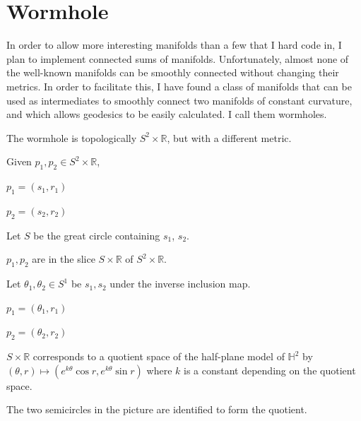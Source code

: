 \section{Wormhole}

In order to allow more interesting manifolds than a few that I hard code in, I plan to implement connected sums of manifolds. Unfortunately, almost none of the well-known manifolds can be smoothly connected without changing their metrics. In order to facilitate this, I have found a class of manifolds that can be used as intermediates to smoothly connect two manifolds of constant curvature, and which allows geodesics to be easily calculated. I call them wormholes.

The wormhole is topologically $S^2 \times \mathbb{R}$, but with a different metric.

Given $p_1, p_2 \in S^2 \times \mathbb{R}$,

$p_1 = (s_1,r_1)$

$p_2 = (s_2,r_2)$

Let $S$ be the great circle containing $s_1$, $s_2$.

$p_1, p_2$ are in the slice $S \times \mathbb{R}$ of $S^2 \times \mathbb{R}$.

Let $\theta_1, \theta_2 \in S^1$ be $s_1, s_2$ under the inverse inclusion map.

$p_1 = (\theta_1,r_1)$

$p_2 = (\theta_2,r_2)$

$S \times \mathbb{R}$ corresponds to a quotient space of the half-plane model of $\mathbb{H}^2$ by $(\theta,r) \mapsto (e^{k\theta} \cos r, e^{k\theta} \sin r)$ where $k$ is a constant depending on the quotient space.

The two semicircles in the picture are identified to form the quotient.

